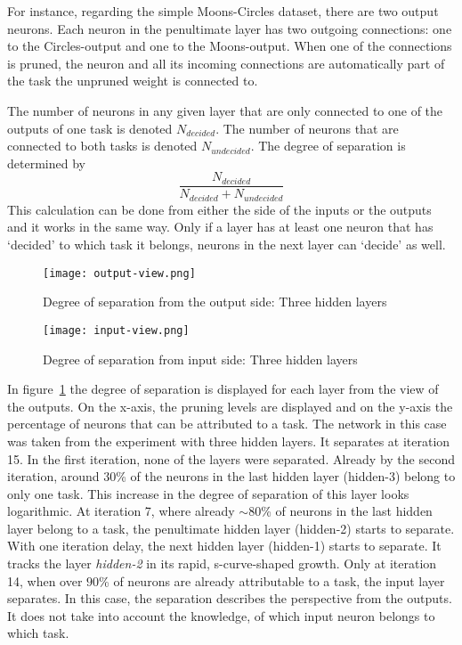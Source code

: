 For instance, regarding the simple Moons-Circles dataset, there are two output neurons.
Each neuron in the penultimate layer has two outgoing connections: one to the Circles-output and one to the Moons-output.
When one of the connections is pruned, the neuron and all its incoming connections are automatically part of the task the unpruned weight is connected to.

The number of neurons in any given layer that are only connected to one of the outputs of one task is denoted $N_{decided}$.
The number of neurons that are connected to both tasks is denoted $N_{undecided}$.
The degree of separation is determined by 
\[ \frac{N_{decided}}{N_{decided}+N_{undecided}} \]
This calculation can be done from either the side of the inputs or the outputs and it works in the same way.
Only if a layer has at least one neuron that has `decided' to which task it belongs, neurons in the next layer can `decide' as well.

\begin{figure}[ht] %
    \centering
    \texttt{[image: output-view.png]}
    \caption{
    Degree of separation from the output side: Three hidden layers
    }\label{fig:outview}
\end{figure}

\begin{figure}[ht] %
    \centering
    \texttt{[image: input-view.png]}
    \caption{    
        Degree of separation from input side: Three hidden layers
    }\label{fig:inview}
\end{figure}

In figure~\ref{fig:outview} the degree of separation is displayed for each layer from the view of the outputs.
On the x-axis, the pruning levels are displayed and on the y-axis the percentage of neurons that can be attributed to a task.
The network in this case was taken from the experiment with three hidden layers.
It separates at iteration 15.
In the first iteration, none of the layers were separated.
Already by the second iteration, around $30$\% of the neurons in the last hidden layer (hidden-3) belong to only one task.
This increase in the degree of separation of this layer looks logarithmic.
At iteration 7, where already $\sim80$\% of neurons in the last hidden layer belong to a task, the penultimate hidden layer (hidden-2) starts to separate.
With one iteration delay, the next hidden layer (hidden-1) starts to separate.
It tracks the layer \textit{hidden-2} in its rapid, s-curve-shaped growth.
Only at iteration 14, when over $90$\% of neurons are already attributable to a task, the input layer separates.
In this case, the separation describes the perspective from the outputs.
It does not take into account the knowledge, of which input neuron belongs to which task.

